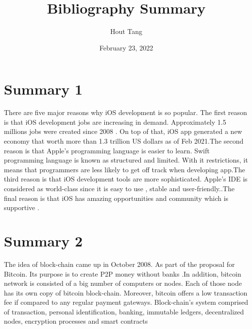 \documentclass{article}
\title{Bibliography Summary}
\author{Hout Tang}
\date{February 23, 2022}
\begin{document}
\maketitle

\section*{Summary 1}

There are five major reasons why iOS development is so popular. The first reason is that iOS development jobs are increasing in demand. Approximately 1.5 millions jobs were created since 2008 \cite{ddArticle}. On top of that, iOS app generated a new economy that worth more than 1.3 trillion US dollars as of Feb 2021.The second reason is that Apple's programming language is easier to learn. Swift programming language is known as structured and limited. With it restrictions, it means that programmers are less likely to get off track when developing app.The third reason is that iOS development tools are more sophisticated. Apple's IDE is considered as world-class since it is easy to use , stable and user-friendly.\cite{ddArticle}.The final reason is that iOS has amazing opportunities and community which is supportive \cite{digiteArticle}.  

\medskip

\section*{Summary 2}

The idea of block-chain came up in October 2008. As part of the proposal for Bitcoin. Its purpose is to create P2P money without banks \cite{ChandramohanJagtapArticle}.In addition, bitcoin network is consisted of a big number of computers or nodes. Each of those node has its own copy of bitcoin block-chain. Moreover, bitcoin offers a low transaction fee if compared to any regular payment gateways. Block-chain's system comprised of transaction, personal identification, banking, immutable ledgers, decentralized nodes, encryption processes and smart contracts \cite{ChandramohanJagtapArticle}


\printbibliography
\end{document}
